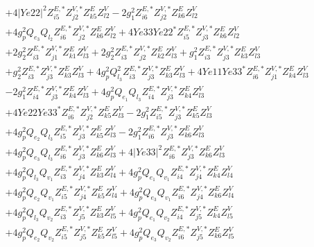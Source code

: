 \begin{align}
 &+4 |Ye22|^2 Z^{E,*}_{i 5} Z^{V,*}_{j 2} Z_{{k 5}}^{E} Z_{{l 2}}^{V} -2 g_{1}^{2} Z^{E,*}_{i 6} Z^{V,*}_{j 2} Z_{{k 6}}^{E} Z_{{l 2}}^{V} \nonumber \\ 
 &+4 g_{p}^{2} Q_{e_3} Q_{l_2} Z^{E,*}_{i 6} Z^{V,*}_{j 2} Z_{{k 6}}^{E} Z_{{l 2}}^{V} +4 Ye33 Ye22^* Z^{E,*}_{i 5} Z^{V,*}_{j 3} Z_{{k 6}}^{E} Z_{{l 2}}^{V} \nonumber \\ 
 &+2 g_{2}^{2} Z^{E,*}_{i 3} Z^{V,*}_{j 1} Z_{{k 1}}^{E} Z_{{l 3}}^{V} +2 g_{2}^{2} Z^{E,*}_{i 3} Z^{V,*}_{j 2} Z_{{k 2}}^{E} Z_{{l 3}}^{V} +g_{1}^{2} Z^{E,*}_{i 3} Z^{V,*}_{j 3} Z_{{k 3}}^{E} Z_{{l 3}}^{V} \nonumber \\ 
 &+g_{2}^{2} Z^{E,*}_{i 3} Z^{V,*}_{j 3} Z_{{k 3}}^{E} Z_{{l 3}}^{V} +4 g_{p}^{2} Q_{l_3}^{2} Z^{E,*}_{i 3} Z^{V,*}_{j 3} Z_{{k 3}}^{E} Z_{{l 3}}^{V} +4 Ye11 Ye33^* Z^{E,*}_{i 6} Z^{V,*}_{j 1} Z_{{k 4}}^{E} Z_{{l 3}}^{V} \nonumber \\ 
 &-2 g_{1}^{2} Z^{E,*}_{i 4} Z^{V,*}_{j 3} Z_{{k 4}}^{E} Z_{{l 3}}^{V} +4 g_{p}^{2} Q_{e_{1}} Q_{l_3} Z^{E,*}_{i 4} Z^{V,*}_{j 3} Z_{{k 4}}^{E} Z_{{l 3}}^{V} \nonumber \\ 
 &+4 Ye22 Ye33^* Z^{E,*}_{i 6} Z^{V,*}_{j 2} Z_{{k 5}}^{E} Z_{{l 3}}^{V} -2 g_{1}^{2} Z^{E,*}_{i 5} Z^{V,*}_{j 3} Z_{{k 5}}^{E} Z_{{l 3}}^{V} \nonumber \\ 
 &+4 g_{p}^{2} Q_{e_{2}} Q_{l_3} Z^{E,*}_{i 5} Z^{V,*}_{j 3} Z_{{k 5}}^{E} Z_{{l 3}}^{V} -2 g_{1}^{2} Z^{E,*}_{i 6} Z^{V,*}_{j 3} Z_{{k 6}}^{E} Z_{{l 3}}^{V} \nonumber \\ 
 &+4 g_{p}^{2} Q_{e_3} Q_{l_3} Z^{E,*}_{i 6} Z^{V,*}_{j 3} Z_{{k 6}}^{E} Z_{{l 3}}^{V} +4 |Ye33|^2 Z^{E,*}_{i 6} Z^{V,*}_{j 3} Z_{{k 6}}^{E} Z_{{l 3}}^{V} \nonumber \\ 
 &+4 g_{p}^{2} Q_{l_3} Q_{v_1} Z^{E,*}_{i 3} Z^{V,*}_{j 4} Z_{{k 3}}^{E} Z_{{l 4}}^{V} +4 g_{p}^{2} Q_{e_{1}} Q_{v_1} Z^{E,*}_{i 4} Z^{V,*}_{j 4} Z_{{k 4}}^{E} Z_{{l 4}}^{V} \nonumber \\ 
 &+4 g_{p}^{2} Q_{e_{2}} Q_{v_1} Z^{E,*}_{i 5} Z^{V,*}_{j 4} Z_{{k 5}}^{E} Z_{{l 4}}^{V} +4 g_{p}^{2} Q_{e_3} Q_{v_1} Z^{E,*}_{i 6} Z^{V,*}_{j 4} Z_{{k 6}}^{E} Z_{{l 4}}^{V} \nonumber \\ 
 &+4 g_{p}^{2} Q_{l_3} Q_{v_2} Z^{E,*}_{i 3} Z^{V,*}_{j 5} Z_{{k 3}}^{E} Z_{{l 5}}^{V} +4 g_{p}^{2} Q_{e_{1}} Q_{v_2} Z^{E,*}_{i 4} Z^{V,*}_{j 5} Z_{{k 4}}^{E} Z_{{l 5}}^{V} \nonumber \\ 
 &+4 g_{p}^{2} Q_{e_{2}} Q_{v_2} Z^{E,*}_{i 5} Z^{V,*}_{j 5} Z_{{k 5}}^{E} Z_{{l 5}}^{V} +4 g_{p}^{2} Q_{e_3} Q_{v_2} Z^{E,*}_{i 6} Z^{V,*}_{j 5} Z_{{k 6}}^{E} Z_{{l 5}}^{V} \nonumber \\ 

\end{align}
